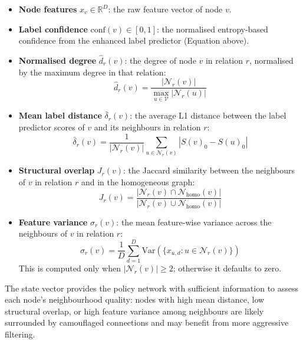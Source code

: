 \begin{itemize}
    \item \textbf{Node features} \( x_v \in \mathbb{R}^D \): the raw feature vector of node \( v \).

    \item \textbf{Label confidence} \( \text{conf}(v) \in [0, 1] \): the normalised entropy-based confidence from the enhanced label predictor (Equation above).

    \item \textbf{Normalised degree} \( \hat{d}_r(v) \): the degree of node \( v \) in relation \( r \), normalised by the maximum degree in that relation:
    \begin{equation}
    \hat{d}_r(v) = \frac{|\mathcal{N}_r(v)|}{\max_{u \in \mathcal{V}} |\mathcal{N}_r(u)|}
    \end{equation}

    \item \textbf{Mean label distance} \( \bar{\delta}_r(v) \): the average L1 distance between the label predictor scores of \( v \) and its neighbours in relation \( r \):
    \begin{equation}
    \bar{\delta}_r(v) = \frac{1}{|\mathcal{N}_r(v)|} \sum_{u \in \mathcal{N}_r(v)} |S(v)_0 - S(u)_0|
    \end{equation}

    \item \textbf{Structural overlap} \( J_r(v) \): the Jaccard similarity between the neighbours of \( v \) in relation \( r \) and in the homogeneous graph:
    \begin{equation}
    J_r(v) = \frac{|\mathcal{N}_r(v) \cap \mathcal{N}_{\text{homo}}(v)|}{|\mathcal{N}_r(v) \cup \mathcal{N}_{\text{homo}}(v)|}
    \end{equation}

    \item \textbf{Feature variance} \( \sigma_r(v) \): the mean feature-wise variance across the neighbours of \( v \) in relation \( r \):
    \begin{equation}
    \sigma_r(v) = \frac{1}{D} \sum_{d=1}^{D} \text{Var}\left( \{ x_{u,d} : u \in \mathcal{N}_r(v) \} \right)
    \end{equation}
    This is computed only when \( |\mathcal{N}_r(v)| \geq 2 \); otherwise it defaults to zero.
\end{itemize}

\noindent
The state vector provides the policy network with sufficient information to assess each node's neighbourhood quality: nodes with high mean distance, low structural overlap, or high feature variance among neighbours are likely surrounded by camouflaged connections and may benefit from more aggressive filtering.


